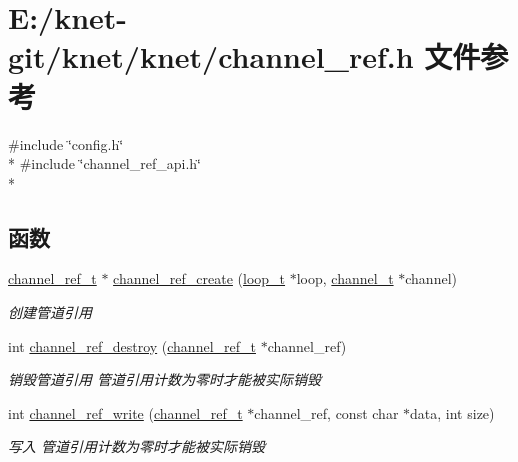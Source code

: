 \hypertarget{a00045}{}\section{E\+:/knet-\/git/knet/knet/channel\+\_\+ref.h 文件参考}
\label{a00045}
{\ttfamily \#include \char`\"{}config.\+h\char`\"{}}\\*
{\ttfamily \#include \char`\"{}channel\+\_\+ref\+\_\+api.\+h\char`\"{}}\\*
\subsection*{函数}
\begin{DoxyCompactItemize}
\item 
\hyperlink{a00047_a151271c9d188ef28d4d24bb81dcc1263_a151271c9d188ef28d4d24bb81dcc1263}{channel\+\_\+ref\+\_\+t} $\ast$ \hyperlink{a00045_a82a1514a1b492ad693c7cb28606a5d01_a82a1514a1b492ad693c7cb28606a5d01}{channel\+\_\+ref\+\_\+create} (\hyperlink{a00047_a9c3ad1cd2de83e09f3a7b59fa82c94ee_a9c3ad1cd2de83e09f3a7b59fa82c94ee}{loop\+\_\+t} $\ast$loop, \hyperlink{a00047_a2effb3e20d0b7e5f6d5ac42118e0330b_a2effb3e20d0b7e5f6d5ac42118e0330b}{channel\+\_\+t} $\ast$channel)
\begin{DoxyCompactList}\small\item\em 创建管道引用 \end{DoxyCompactList}\item 
int \hyperlink{a00045_a8c61b880489dcb1a556e3458e748d9f7_a8c61b880489dcb1a556e3458e748d9f7}{channel\+\_\+ref\+\_\+destroy} (\hyperlink{a00047_a151271c9d188ef28d4d24bb81dcc1263_a151271c9d188ef28d4d24bb81dcc1263}{channel\+\_\+ref\+\_\+t} $\ast$channel\+\_\+ref)
\begin{DoxyCompactList}\small\item\em 销毁管道引用 管道引用计数为零时才能被实际销毁 \end{DoxyCompactList}\item 
int \hyperlink{a00045_a0688f00d64ff34ae18fd4a354d890029_a0688f00d64ff34ae18fd4a354d890029}{channel\+\_\+ref\+\_\+write} (\hyperlink{a00047_a151271c9d188ef28d4d24bb81dcc1263_a151271c9d188ef28d4d24bb81dcc1263}{channel\+\_\+ref\+\_\+t} $\ast$channel\+\_\+ref, const char $\ast$data, int size)
\begin{DoxyCompactList}\small\item\em 写入 管道引用计数为零时才能被实际销毁 \end{DoxyCompactList}\item 

\end{DoxyCompactItemize}
